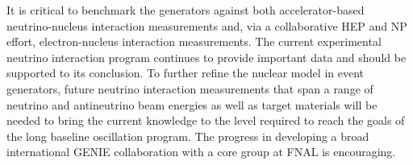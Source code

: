 It is critical to benchmark the generators against both
accelerator-based neutrino-nucleus interaction measurements and, via a
collaborative HEP and NP effort, electron-nucleus interaction
measurements.
The current experimental neutrino interaction program %
continues to provide important data and should be supported to its
conclusion.  To further refine the nuclear model in event generators,
future neutrino interaction measurements that span a range of neutrino
and antineutrino beam energies as well as target materials will be
needed to bring the current knowledge to the level required to reach
the goals of the long baseline oscillation program. The progress in
developing a broad international GENIE collaboration with a core group
at FNAL is encouraging.


